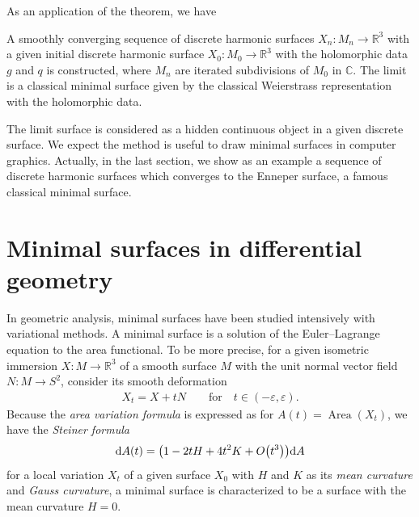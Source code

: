 \documentclass[pdftex]{sigma}
\newcommand{\R}{\mathbb{R}}
\newcommand{\C}{\mathbb{C}}
\renewcommand{\epsilon}{\varepsilon}
\DeclareMathOperator{\Area}{Area}
\newcommand{\1}{{\bf 1}}
\numberwithin{equation}{section}
\begin{document}
As an application of the theorem, we have
\begin{theorem*}
 A smoothly converging sequence of discrete harmonic surfaces $X_n \colon M_n \to \R^3$
 with a given initial discrete harmonic surface $X_0\colon M_0 \to \R^3$ with the holomorphic data $g$ and $q$ is constructed,
 where $M_n$ are iterated subdivisions of $M_0$ in $\C$.
 The limit is a classical minimal surface given by the classical Weierstrass representation with the holomorphic data.
\end{theorem*}
The limit surface is considered as a hidden continuous object in a given discrete surface.
We expect the method is useful to draw minimal surfaces in computer graphics.
Actually, in the last section, we show as an example a sequence of discrete harmonic surfaces which converges to the Enneper surface, a famous classical minimal surface.

\section{Minimal surfaces in differential geometry}

In geometric analysis,
minimal surfaces have been studied intensively with variational methods.
A minimal surface is a solution of the Euler--Lagrange equation to the area functional.
To be more precise,
for a given isometric immersion $X\colon M \to \R^3$ of a smooth surface $M$ with the unit normal vector field $N\colon M \to S^2$,
consider its smooth deformation
\begin{gather*}
 X_t = X +tN \qquad \text{for}\quad t \in (-\epsilon, \epsilon).
\end{gather*}
Because the {\em area variation formula} is expressed as for $A(t)= \Area(X_t)$, we have the {\em Steiner formula}\label{steinerformula}
\begin{gather*}
 {\rm d}A(t) = \big(1 -2tH+ 4t^2 K +O\big(t^3\big)\big){\rm d}A
\end{gather*}
for a local variation $X_t$ of a given surface $X_0$ with $H$ and $K$ as
its {\em mean curvature} and {\em Gauss curvature}, a minimal surface is characterized to be a surface with the mean curvature $H =0$.
\end{document}
